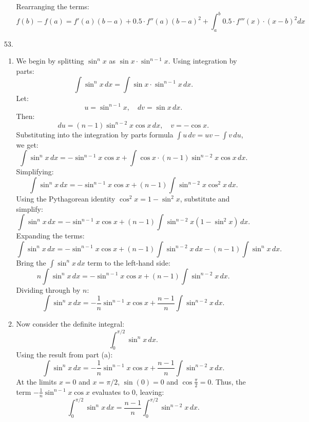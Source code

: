\documentclass[12pt]{article}
\begin{document}
\begin{enumerate}
\begin{enumerate}
Rearranging the terms:
\[
f(b) - f(a) = f'(a)(b-a) + 0.5\cdot f''(a)(b-a)^2 + \int_a^b 0.5 \cdot f'''(x)\cdot(x-b)^2 dx
\]

    \end{enumerate}
    \item [53. ]
    \begin{enumerate}
        \item 
        We begin by splitting \(\sin^n x\) as \(\sin x \cdot \sin^{n-1} x\). Using integration by parts:
        \[
        \int \sin^n x \, dx = \int \sin x \cdot \sin^{n-1} x \, dx.
        \]
        Let:
        \[
        u = \sin^{n-1} x, \quad dv = \sin x \, dx.
        \]
        Then:
        \[
        du = (n-1) \sin^{n-2} x \cos x \, dx, \quad v = -\cos x.
        \]
        Substituting into the integration by parts formula \(\int u \, dv = uv - \int v \, du\), we get:
        \[
        \int \sin^n x \, dx = -\sin^{n-1} x \cos x + \int \cos x \cdot (n-1) \sin^{n-2} x \cos x \, dx.
        \]
        Simplifying:
        \[
        \int \sin^n x \, dx = -\sin^{n-1} x \cos x + (n-1) \int \sin^{n-2} x \cos^2 x \, dx.
        \]
        Using the Pythagorean identity \(\cos^2 x = 1 - \sin^2 x\), substitute and simplify:
        \[
        \int \sin^n x \, dx = -\sin^{n-1} x \cos x + (n-1) \int \sin^{n-2} x (1 - \sin^2 x) \, dx.
        \]
        Expanding the terms:
        \[
        \int \sin^n x \, dx = -\sin^{n-1} x \cos x + (n-1) \int \sin^{n-2} x \, dx - (n-1) \int \sin^n x \, dx.
        \]
        Bring the \(\int \sin^n x \, dx\) term to the left-hand side:
        \[
        n \int \sin^n x \, dx = -\sin^{n-1} x \cos x + (n-1) \int \sin^{n-2} x \, dx.
        \]
        Dividing through by \(n\):
        \[
        \int \sin^n x \, dx = -\frac{1}{n} \sin^{n-1} x \cos x + \frac{n-1}{n} \int \sin^{n-2} x \, dx.
        \]

        \item
        Now consider the definite integral:
        \[
        \int_0^{\pi/2} \sin^n x \, dx.
        \]
        Using the result from part (a):
        \[
        \int \sin^n x \, dx = -\frac{1}{n} \sin^{n-1} x \cos x + \frac{n-1}{n} \int \sin^{n-2} x \, dx.
        \]
        At the limits \(x = 0\) and \(x = \pi/2\), \(\sin (0) = 0\) and \(\cos \frac{\pi}{2} = 0\). Thus, the term \(-\frac{1}{n} \sin^{n-1} x \cos x\) evaluates to 0, leaving:
        \[
        \int_0^{\pi/2} \sin^n x \, dx = \frac{n-1}{n} \int_0^{\pi/2} \sin^{n-2} x \, dx.
        \]


\end{enumerate}
\end{enumerate}
\end{document}
